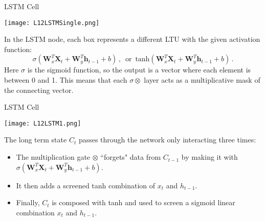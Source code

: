 \documentclass[10pt, table, dvipsnames,xcdraw, handout]{beamer}
\begin{document}
\begin{frame}[fragile]{LSTM Cell}
  \begin{minipage}[t][0.5\textheight][t]{\textwidth}
	\centering \texttt{[image: L12LSTMSingle.png]} 
  \end{minipage}
  \vfill
\begin{minipage}[t][0.5\textheight][t]{\textwidth}
In the LSTM node, each box represents a different LTU with the given activation function:
$$
\sigma(\mathbf{W}_x^T\mathbf{X}_t +\mathbf{W}_y^T\mathbf{h}_{t-1} +b)\,,\,\,\,\text{or}\,\,\,\text{tanh}(\mathbf{W}_x^T\mathbf{X}_t +\mathbf{W}_y^T\mathbf{h}_{t-1} +b)\,.
$$\pause
Here $\sigma$ is the sigmoid function, so the output is a vector where each element is between 0 and 1. This means that each $\sigma \otimes$ layer acts as a multiplicative mask of the connecting vector. 
\end{minipage}
\end{frame}











\begin{frame}[fragile]{LSTM Cell}
  \begin{minipage}[t][0.5\textheight][t]{\textwidth}
	\centering \texttt{[image: L12LSTM1.png]} 
  \end{minipage}
  \vfill
\begin{minipage}[t][0.5\textheight][t]{\textwidth}
The long term state $C_{t}$ passes through the network only interacting three times:\pause
\begin{itemize}
\item[] The multiplication gate $\otimes$ ``forgets" data from $C_{t-1}$ by making it with $\sigma(\mathbf{W}_x^T\mathbf{X}_t +\mathbf{W}_y^T\mathbf{h}_{t-1} +b)$. \pause
\item[] It then adds a screened tanh combination of $x_{t}$ and $h_{t-1}$.\pause
\item[] Finally, $C_{t}$ is composed with tanh and used to screen a sigmoid linear combination $x_{t}$ and $h_{t-1}$.
\end{itemize}
\end{minipage}
\end{frame}
\end{document}
